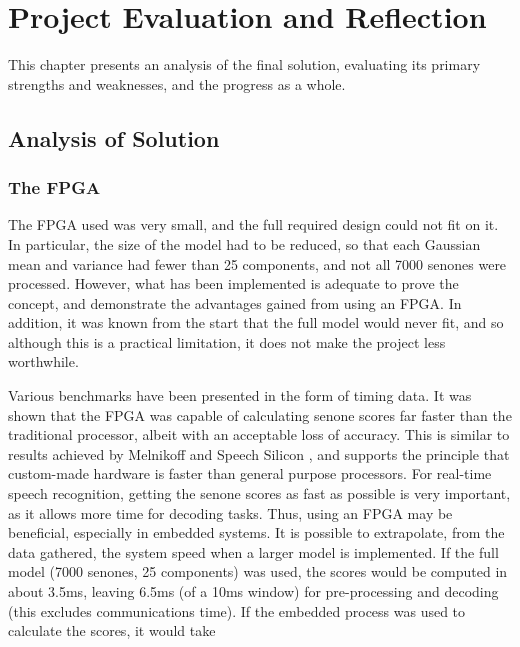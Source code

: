 \chapter{Project Evaluation and Reflection} %
\label{cha:project_analysis}

This chapter presents an analysis of the final solution, evaluating its primary strengths and weaknesses, and the progress as a whole.

\section{Analysis of Solution} %
\label{sec:analysis_of_solution}

	\subsection{The FPGA} %
	\label{sub:analysis_the_fpga}
		The FPGA used was very small, and the full required design could not fit on it.  In particular, the size of the model had to be reduced, so that each Gaussian mean and variance had fewer than 25 components, and not all 7000 senones were processed.  However, what has been implemented is adequate to prove the concept, and demonstrate the advantages gained from using an FPGA.  In addition, it was known from the start that the full model would never fit, and so although this is a practical limitation, it does not make the project less worthwhile.

		Various benchmarks have been presented in the form of timing data.  It was shown that the FPGA was capable of calculating senone scores far faster than the traditional processor, albeit with an acceptable loss of accuracy.  This is similar to results achieved by Melnikoff \cite{melnikoff2003speech} and Speech Silicon \cite{schuster2006speech}, and supports the principle that custom-made hardware is faster than general purpose processors.  For real-time speech recognition, getting the senone scores as fast as possible is very important, as it allows more time for decoding tasks.  Thus, using an FPGA may be beneficial, especially in embedded systems.  It is possible to extrapolate, from the data gathered, the system speed when a larger model is implemented.  If the full model (7000 senones, 25 components) was used, the scores would be computed in about 3.5ms, leaving 6.5ms (of a 10ms window) for pre-processing and decoding (this excludes communications time).  If the embedded process was used to calculate the scores, it would take %

